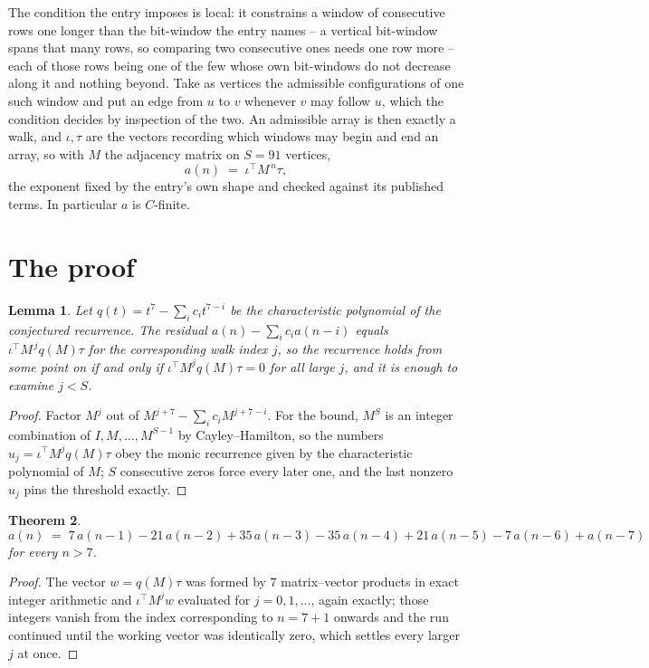 \documentclass[11pt,a4paper]{article}
\theoremstyle{plain}
\newtheorem{theorem}{Theorem}
\newtheorem{lemma}[theorem]{Lemma}
\theoremstyle{definition}
\begin{document}
The condition the entry imposes is local: it constrains a window of consecutive rows one longer than the bit-window the entry names -- a vertical bit-window spans that many rows, so comparing two consecutive ones needs one row more -- each of those rows being one of the few whose own bit-windows do not decrease along it and nothing beyond. Take as vertices the admissible configurations of one such window and put an edge from $u$ to $v$ whenever $v$ may follow $u$, which the condition decides by inspection of the two.
An admissible array is then exactly a walk, and $\iota,\tau$ are the vectors recording which windows may begin and end an array, so with $M$ the adjacency matrix on $S=91$ vertices,
\[
a(n)\;=\;\iota^{\!\top}M^{\,n}\tau ,
\]
the exponent fixed by the entry's own shape and checked against its published terms. In
particular $a$ is $C$-finite.

\section{The proof}

\begin{lemma}\label{lem:crit}
Let $q(t)=t^{7}-\sum_i c_it^{7-i}$ be the characteristic polynomial of the
conjectured recurrence. The residual $a(n)-\sum_ic_ia(n-i)$ equals
$\iota^{\!\top}M^{\,j}q(M)\tau$ for the corresponding walk index $j$, so the recurrence
holds from some point on if and only if $\iota^{\!\top}M^{j}q(M)\tau=0$ for all large $j$,
and it is enough to examine $j<S$.
\end{lemma}

\begin{proof}
Factor $M^{j}$ out of $M^{j+7}-\sum_ic_iM^{j+7-i}$. For the bound, $M^{S}$
is an integer combination of $I,M,\dots,M^{S-1}$ by Cayley--Hamilton, so the numbers
$u_j=\iota^{\!\top}M^{j}q(M)\tau$ obey the monic recurrence given by the characteristic
polynomial of $M$; $S$ consecutive zeros force every later one, and the last nonzero $u_j$
pins the threshold exactly.
\end{proof}

\begin{theorem}
\[
a(n)\;=\;7\,a(n-1) - 21\,a(n-2) + 35\,a(n-3) - 35\,a(n-4) + 21\,a(n-5) - 7\,a(n-6) + a(n-7)
\]
for every $n>7$.
\end{theorem}

\begin{proof}
The vector $w=q(M)\tau$ was formed by $7$ matrix--vector products in exact integer
arithmetic and $\iota^{\!\top}M^{j}w$ evaluated for $j=0,1,\dots$, again exactly; those
integers vanish from the index corresponding to $n=7+1$ onwards and the run continued
until the working vector was identically zero, which settles every larger $j$ at once.
\end{proof}
\end{document}
